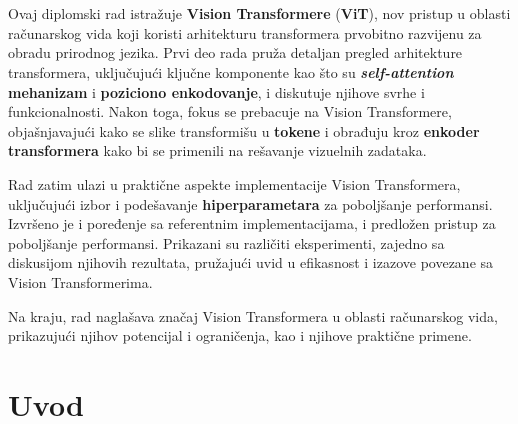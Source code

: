 \documentclass[12pt]{article}
\begin{document}
   \newpage


   \thispagestyle{empty} %
   \renewcommand{\contentsname}{Sadržaj}
   \tableofcontents

   
   \newpage
   
   \thispagestyle{empty} %

   \newcommand{\specialsection}[1]{
      \section*{\centering{#1}} %
   }

   \vspace*{0.5in}
   \specialsection{Apstrakt}
   

   \vspace*{0.5in}

   Ovaj diplomski rad istražuje \textbf{Vision Transformere} (\textbf{ViT}),
   nov pristup u oblasti računarskog vida koji koristi arhitekturu
   transformera prvobitno razvijenu za obradu prirodnog jezika. Prvi deo rada pruža detaljan pregled arhitekture transformera, 
   uključujući ključne komponente kao što su \textbf{\textit{self-attention} mehanizam} i \textbf{poziciono enkodovanje},
   i diskutuje njihove svrhe i funkcionalnosti. Nakon toga, fokus se prebacuje
   na Vision Transformere, objašnjavajući kako se slike transformišu
   u \textbf{tokene} i obrađuju kroz \textbf{enkoder transformera} kako bi se primenili na rešavanje vizuelnih zadataka.

   Rad zatim ulazi u praktične aspekte implementacije Vision Transformera,
   uključujući izbor i podešavanje \textbf{hiperparametara} za poboljšanje performansi.
   Izvršeno je i poređenje sa referentnim implementacijama, i predložen pristup za 
   poboljšanje performansi. Prikazani su različiti
   eksperimenti, zajedno sa diskusijom njihovih rezultata, pružajući uvid
   u efikasnost i izazove povezane sa Vision Transformerima.

   Na kraju, rad naglašava značaj Vision Transformera u oblasti računarskog vida, 
   prikazujući njihov potencijal i ograničenja, kao i njihove praktične primene.

   \newpage
   \setcounter{page}{1}

   \section{Uvod}
   
\end{document}
